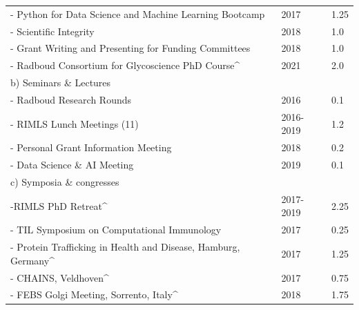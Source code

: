 \begin{table}[h]
{\begin{tabular}{llllll}
\multicolumn{4}{l}{- Python for Data Science and Machine Learning Bootcamp}                         & 2017      & 1.25                 \\
\multicolumn{4}{l}{- Scientific Integrity}                                                          & 2018      & 1.0                  \\
\multicolumn{4}{l}{- Grant Writing and Presenting for Funding Committees}                           & 2018      & 1.0                  \\
\multicolumn{4}{l}{- Radboud Consortium for Glycoscience PhD Course\textasciicircum{}}              & 2021      & 2.0                  \\ \hline
\multicolumn{4}{l}{b) Seminars \& Lectures}                                                         &           &                      \\
\multicolumn{4}{l}{- Radboud Research Rounds}                                                       & 2016      & 0.1                  \\
\multicolumn{4}{l}{- RIMLS Lunch Meetings (11)}                                                     & 2016-2019 & 1.2                  \\
\multicolumn{4}{l}{- Personal Grant Information Meeting}                                            & 2018      & 0.2                  \\
\multicolumn{4}{l}{- Data Science \& AI Meeting}                                                    & 2019      & 0.1                  \\ \hline
\multicolumn{4}{l}{c) Symposia \& congresses}                                                       &           &                      \\
\multicolumn{4}{l}{-RIMLS PhD Retreat\textasciicircum{}}                                            & 2017-2019 & 2.25                 \\
\multicolumn{4}{l}{- TIL Symposium on Computational Immunology}                                     & 2017      & 0.25                 \\
\multicolumn{4}{l}{- Protein Trafficking in Health and Disease, Hamburg, Germany\textasciicircum{}} & 2017      & 1.25                 \\
\multicolumn{4}{l}{- CHAINS, Veldhoven\textasciicircum{}}                                           & 2017      & 0.75                 \\
\multicolumn{4}{l}{- FEBS Golgi Meeting, Sorrento, Italy\textasciicircum{}}                         & 2018      & 1.75                 \\

\end{tabular}}
\end{table}
